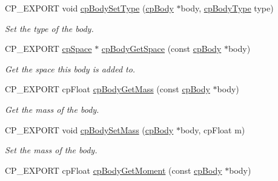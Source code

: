 \begin{DoxyCompactItemize}
\mbox{\label{group__cpBody_ga0ad914398f84d9096a7292f5e55e5771}} 
C\+P\+\_\+\+E\+X\+P\+O\+RT void \hyperlink{group__cpBody_ga0ad914398f84d9096a7292f5e55e5771}{cp\+Body\+Set\+Type} (\hyperlink{structcpBody}{cp\+Body} $\ast$body, \hyperlink{group__cpBody_ga3581b128fd3e2734952aeac8545fd5ca}{cp\+Body\+Type} type)
\begin{DoxyCompactList}\small\item\em Set the type of the body. \end{DoxyCompactList}\item 
\mbox{\label{group__cpBody_gafd7267ae4dc1b40a482244534aa00cb9}} 
C\+P\+\_\+\+E\+X\+P\+O\+RT \hyperlink{structcpSpace}{cp\+Space} $\ast$ \hyperlink{group__cpBody_gafd7267ae4dc1b40a482244534aa00cb9}{cp\+Body\+Get\+Space} (const \hyperlink{structcpBody}{cp\+Body} $\ast$body)
\begin{DoxyCompactList}\small\item\em Get the space this body is added to. \end{DoxyCompactList}\item 
\mbox{\label{group__cpBody_ga1b9825773096740ac0a6b8c6320629bf}} 
C\+P\+\_\+\+E\+X\+P\+O\+RT cp\+Float \hyperlink{group__cpBody_ga1b9825773096740ac0a6b8c6320629bf}{cp\+Body\+Get\+Mass} (const \hyperlink{structcpBody}{cp\+Body} $\ast$body)
\begin{DoxyCompactList}\small\item\em Get the mass of the body. \end{DoxyCompactList}\item 
\mbox{\label{group__cpBody_gac9177db2517a408213b37b8d071c9732}} 
C\+P\+\_\+\+E\+X\+P\+O\+RT void \hyperlink{group__cpBody_gac9177db2517a408213b37b8d071c9732}{cp\+Body\+Set\+Mass} (\hyperlink{structcpBody}{cp\+Body} $\ast$body, cp\+Float m)
\begin{DoxyCompactList}\small\item\em Set the mass of the body. \end{DoxyCompactList}\item 
\mbox{\label{group__cpBody_gada72b5ece7fe990a15516ab1d2a59fd2}} 
C\+P\+\_\+\+E\+X\+P\+O\+RT cp\+Float \hyperlink{group__cpBody_gada72b5ece7fe990a15516ab1d2a59fd2}{cp\+Body\+Get\+Moment} (const \hyperlink{structcpBody}{cp\+Body} $\ast$body)

\end{DoxyCompactItemize}
